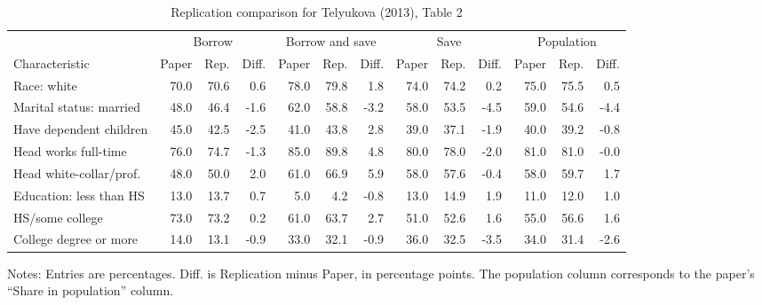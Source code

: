 \begin{table}[!htbp]
\centering
\begin{threeparttable}
\caption{Replication comparison for Telyukova (2013), Table 2}
\label{tab:telyukova_table2_replication_comparison}
\begingroup
\scriptsize
\setlength{\tabcolsep}{2.5pt}
\begin{tabular}{lrrrrrrrrrrrr}
\toprule
 & \multicolumn{3}{c}{Borrow} & \multicolumn{3}{c}{Borrow and save} & \multicolumn{3}{c}{Save} & \multicolumn{3}{c}{Population} \\
\cmidrule(lr){2-4} \cmidrule(lr){5-7} \cmidrule(lr){8-10} \cmidrule(lr){11-13}
Characteristic & Paper & Rep. & Diff. & Paper & Rep. & Diff. & Paper & Rep. & Diff. & Paper & Rep. & Diff. \\
\midrule
Race: white & 70.0 & 70.6 & 0.6 & 78.0 & 79.8 & 1.8 & 74.0 & 74.2 & 0.2 & 75.0 & 75.5 & 0.5 \\
Marital status: married & 48.0 & 46.4 & -1.6 & 62.0 & 58.8 & -3.2 & 58.0 & 53.5 & -4.5 & 59.0 & 54.6 & -4.4 \\
Have dependent children & 45.0 & 42.5 & -2.5 & 41.0 & 43.8 & 2.8 & 39.0 & 37.1 & -1.9 & 40.0 & 39.2 & -0.8 \\
Head works full-time & 76.0 & 74.7 & -1.3 & 85.0 & 89.8 & 4.8 & 80.0 & 78.0 & -2.0 & 81.0 & 81.0 & -0.0 \\
Head white-collar/prof. & 48.0 & 50.0 & 2.0 & 61.0 & 66.9 & 5.9 & 58.0 & 57.6 & -0.4 & 58.0 & 59.7 & 1.7 \\
Education: less than HS & 13.0 & 13.7 & 0.7 & 5.0 & 4.2 & -0.8 & 13.0 & 14.9 & 1.9 & 11.0 & 12.0 & 1.0 \\
HS/some college & 73.0 & 73.2 & 0.2 & 61.0 & 63.7 & 2.7 & 51.0 & 52.6 & 1.6 & 55.0 & 56.6 & 1.6 \\
College degree or more & 14.0 & 13.1 & -0.9 & 33.0 & 32.1 & -0.9 & 36.0 & 32.5 & -3.5 & 34.0 & 31.4 & -2.6 \\
\bottomrule
\end{tabular}
\endgroup
\begin{tablenotes}[flushleft]
\footnotesize
\item Notes: Entries are percentages. Diff. is Replication minus Paper, in percentage points. The population column corresponds to the paper's ``Share in population'' column.
\end{tablenotes}
\end{threeparttable}
\end{table}